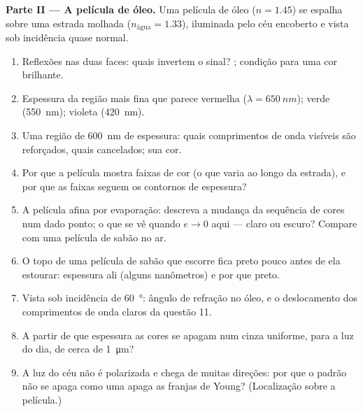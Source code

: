 \begin{problem}
\medskip
\noindent\textbf{Parte II --- A película de óleo.}
Uma película de óleo ($n = 1.45$) se espalha sobre uma estrada molhada ($n_{\text{água}} = 1.33$),
iluminada pelo céu encoberto e vista sob incidência quase normal.
\begin{enumerate}[resume]
  \item Reflexões nas duas faces: quais invertem o sinal? ; condição para uma cor brilhante.
  \item Espessura da região mais fina que parece vermelha ($\lambda =
        \qty{650}{nm}$); verde (\qty{550}{nm}); violeta (\qty{420}{nm}).
  \item Uma região de \qty{600}{nm} de espessura: quais comprimentos de onda visíveis são
        reforçados, quais cancelados; sua cor.
  \item Por que a película mostra faixas de cor (o que varia ao longo da
        estrada), e por que as faixas seguem os contornos de espessura?
  \item A película afina por evaporação: descreva a mudança da
        sequência de cores num dado ponto; o que se vê quando $e \to 0$
        aqui --- claro ou escuro? Compare com uma película de sabão no ar.
  \item O topo de uma película de sabão que escorre fica preto pouco antes de
        ela estourar: espessura ali (alguns nanômetros) e por que preto.
  \item Vista sob incidência de \qty{60}{\degree}: ângulo de refração no óleo,
        e o deslocamento dos comprimentos de onda claros da questão 11.
  \item A partir de que espessura as cores se apagam num cinza
        uniforme, para a luz do dia, de  cerca de \qty{1}{\micro m}?
  \item A luz do céu não é polarizada e chega de muitas
        direções: por que o padrão não se apaga como uma 
        apaga as franjas de Young? (Localização sobre a película.)
\end{enumerate}


\end{problem}
